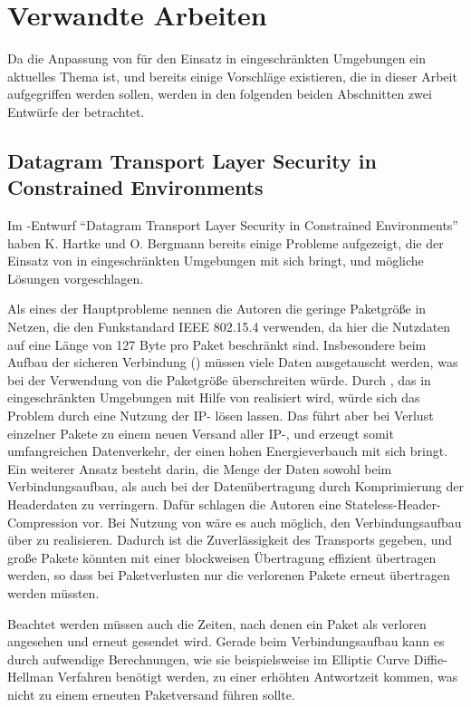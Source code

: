 \section{Verwandte Arbeiten}

Da die Anpassung von  für den Einsatz in eingeschränkten Umgebungen ein aktuelles Thema ist, und bereits einige Vorschläge
existieren, die in dieser Arbeit aufgegriffen werden sollen, werden in den folgenden beiden Abschnitten zwei Entwürfe der  betrachtet.

\subsection{Datagram Transport Layer Security in Constrained Environments}
Im -Entwurf "`Datagram Transport Layer Security in Constrained Environments"' \cite{draftcodtls} haben K. Hartke und O. Bergmann
bereits einige Probleme aufgezeigt, die der Einsatz von  in eingeschränkten Umgebungen mit sich bringt, und mögliche Lösungen vorgeschlagen.

Als eines der Hauptprobleme nennen die Autoren die geringe Paketgröße in Netzen, die den Funkstandard IEEE 802.15.4 \cite{ieee802154} verwenden,
da hier die Nutzdaten auf eine Länge von 127 Byte pro Paket beschränkt sind. Insbesondere beim Aufbau der sicheren Verbindung () müssen
viele Daten ausgetauscht werden, was bei der Verwendung von  die Paketgröße überschreiten würde. Durch  \cite{rfc2460}, das in
eingeschränkten Umgebungen mit Hilfe von  \cite{rfc4944} realisiert wird, würde sich das Problem durch eine Nutzung der IP-
lösen lassen. Das führt aber bei Verlust einzelner Pakete zu einem neuen Versand aller IP-, und erzeugt somit umfangreichen Datenverkehr,
der einen hohen Energieverbauch mit sich bringt. Ein weiterer Ansatz besteht darin, die Menge der Daten sowohl beim Verbindungsaufbau, als auch bei der
Datenübertragung durch Komprimierung der Headerdaten zu verringern. Dafür schlagen die Autoren eine Stateless-Header-Compression vor. Bei Nutzung von
 wäre es auch möglich, den Verbindungsaufbau über  zu realisieren. Dadurch ist die Zuverlässigkeit des Transports gegeben, und große Pakete
könnten mit einer blockweisen Übertragung effizient übertragen werden, so dass bei Paketverlusten nur die verlorenen Pakete erneut übertragen werden müssten.

Beachtet werden müssen auch die Zeiten, nach denen ein Paket als verloren angesehen und erneut gesendet wird. Gerade beim Verbindungsaufbau
kann es durch aufwendige Berechnungen, wie sie beispielsweise im Elliptic Curve Diffie-Hellman Verfahren benötigt werden, zu einer erhöhten
Antwortzeit kommen, was nicht zu einem erneuten Paketversand führen sollte.

